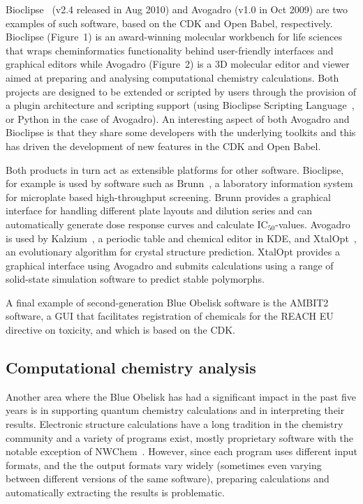 \documentclass[10pt]{bmc_article}
\newenvironment{bmcformat}{\fussy\setboolean{publ}{true}}{\fussy}
\begin{document}
\begin{bmcformat}
Bioclipse~\cite{Spjuth:2007fk} (v2.4 released in Aug 2010) and Avogadro
\cite{WebAvogadro} (v1.0 in Oct 2009) are two examples of such software, based
on the CDK and Open Babel, respectively. Bioclipse (Figure~1) is an award-winning
molecular workbench for life sciences
that wraps cheminformatics functionality behind user-friendly interfaces and
graphical editors while Avogadro (Figure~2) is a 3D molecular editor and viewer aimed at
preparing and analysing computational chemistry calculations. Both
projects are designed to be extended or scripted by users through
the provision of a plugin architecture and scripting support (using
Bioclipse Scripting Language~\cite{Bioclipse2}, or Python in the case
of Avogadro). An interesting aspect of both Avogadro and Bioclipse is
that they share some developers with the underlying toolkits and this
has driven the development of new features in the CDK and Open Babel.

Both products in turn act as extensible platforms for other
software. Bioclipse, for example is used by software
such as Brunn~\cite{Alvarsson:2011fk}, a laboratory information system for
microplate based high-throughput screening. Brunn provides a graphical interface
for handling different plate layouts and dilution series and can automatically
generate dose response curves and calculate IC$_{50}$-values. Avogadro
is used by Kalzium~\cite{WebKalzium}, a periodic table and chemical editor in KDE,
and XtalOpt~\cite{WebXtalOpt}\cite{Lonie2011}, an evolutionary
algorithm for crystal structure prediction. XtalOpt provides a
graphical interface using Avogadro and submits calculations using a
range of solid-state simulation software to predict stable polymorphs.

A final example of second-generation Blue Obelisk software is the 
AMBIT2~\cite{Jeliazkova2011} software, a GUI that facilitates registration
of chemicals for the REACH EU directive on toxicity, and which is
based on the CDK.

\subsection*{Computational chemistry analysis}

Another area where the Blue Obelisk has had a significant impact in the
past five years is in supporting
quantum chemistry calculations and in interpreting their results.
Electronic structure calculations have a long tradition in the
chemistry community and a variety of programs exist, mostly
proprietary software with the notable exception of
NWChem~\cite{NWChem}.
However, since each program uses different input formats, and the
the output formats vary widely (sometimes even varying between different versions
of the same software), preparing calculations and automatically extracting
the results is problematic. 


\end{bmcformat}
\end{document}
